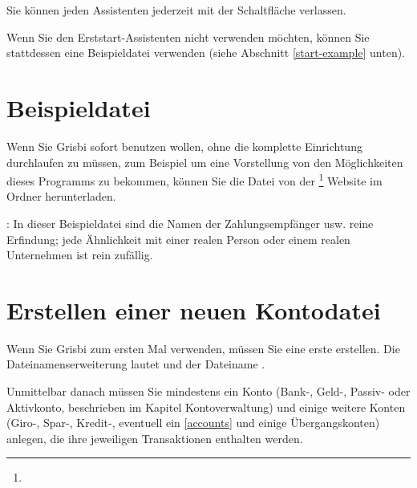 Sie können jeden Assistenten jederzeit mit der Schaltfläche  verlassen.

Wenn Sie den Erststart-Assistenten nicht verwenden möchten, können Sie stattdessen eine Beispieldatei verwenden (siehe Abschnitt \ref{start-example} unten).

\section{Beispieldatei\label{start-example}}

Wenn Sie Grisbi sofort benutzen wollen, ohne die komplette Einrichtung durchlaufen zu müssen, zum Beispiel um eine Vorstellung von den Möglichkeiten dieses Programms zu bekommen, können Sie die Datei  von der \footnote{\urlSourceForgeDocumentation{}} Website im Ordner  herunterladen.

\Note{}: In dieser Beispieldatei sind die Namen der Zahlungsempfänger usw. reine Erfindung; jede Ähnlichkeit mit einer realen Person oder einem realen Unternehmen ist rein zufällig.%

\section{Erstellen einer neuen Kontodatei\label{start-newfile}}

Wenn Sie Grisbi zum ersten Mal verwenden, müssen Sie eine erste  erstellen. Die \gls{Dateinamenserweiterung} lautet  und der Dateiname .%

Unmittelbar danach müssen Sie mindestens ein Konto (Bank-, Geld-, Passiv- oder Aktivkonto, beschrieben im Kapitel Kontoverwaltung) und einige weitere Konten (Giro-, Spar-, Kredit-, eventuell ein \vref{accounts}  und einige Übergangskonten) anlegen, die ihre jeweiligen Transaktionen enthalten werden.%

